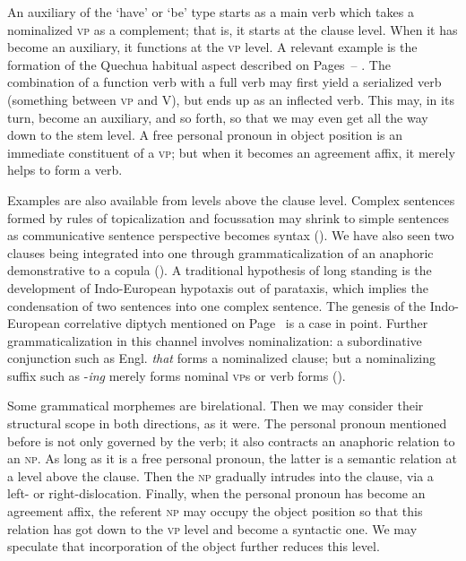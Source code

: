 An auxiliary of the ‘have’ or ‘be’ type starts as a main verb which takes a nominalized \textsc{vp} as a complement; that is, it starts at the clause level. When it has become an auxiliary, it functions at the \textsc{vp} level. A relevant example is the formation of the Quechua habitual aspect described on Pages~\pageref{page33b}--\pageref{page34}\chk%
. The combination of a function verb with a full verb may first yield a serialized verb (something between \textsc{vp} and V), but ends up as an inflected verb. This may, in its turn, become an auxiliary, and so forth, so that we may even get all the way down to the stem level. A free personal pronoun in object position is an immediate constituent of a \textsc{vp}; but when it becomes an agreement affix, it merely helps to form a verb.

Examples are also available from levels above the clause level. Complex sentences formed by rules of topicalization and focussation may shrink to simple sentences as communicative sentence perspective becomes syntax (). We have also seen two clauses being integrated into one through grammaticalization of an anaphoric demonstrative to a copula (). A traditional hypothesis of long standing is the development of Indo-European hypotaxis out of parataxis, which implies the condensation of two sentences into one complex sentence. The genesis of the Indo-European correlative diptych mentioned on Page~\pageref{page125b}\chk%
 is a case in point. Further grammaticalization in this channel involves nominalization: a subordinative conjunction such as Engl. \textit{that} forms a nominalized clause; but a nominalizing suffix such as -\textit{ing} merely forms nominal \textsc{vp}s or verb forms ().

Some grammatical morphemes are birelational. Then we may consider their structural scope in both directions, as it were. The personal pronoun mentioned before is not only governed by the verb; it also contracts an anaphoric relation to an \textsc{np}. As long as it is a free personal pronoun, the latter is a semantic relation at a level above the clause. Then the \textsc{np} gradually intrudes into the clause, via a left- or right-dislocation. Finally, when the personal pronoun has become an agreement affix, the referent \textsc{np} may occupy the object position so that this relation has got down to the \textsc{vp} level and become a syntactic one. We may speculate that incorporation of the object further reduces this level.

